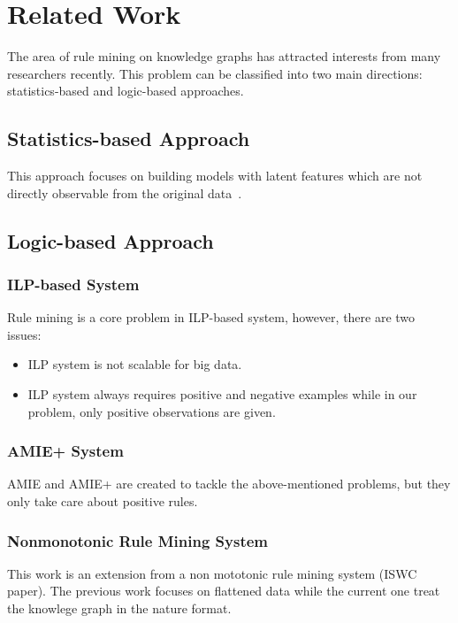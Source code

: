 \chapter{Related Work}

The area of rule mining on knowledge graphs has attracted interests from many researchers recently. This problem can be classified into two main directions: statistics-based and logic-based approaches.

\section{Statistics-based Approach}

This approach focuses on building models with latent features which are not directly observable from the original data~\cite{ref1}.

\section{Logic-based Approach}

\subsection{ILP-based System}

Rule mining is a core problem in ILP-based system, however, there are two issues:

\begin{itemize}
	\item ILP system is not scalable for big data.
	\item ILP system always requires positive and negative examples while in our problem, only positive observations are given.
\end{itemize}

\subsection{AMIE+ System}

AMIE and AMIE+ are created to tackle the above-mentioned problems, but they only take care about positive rules.

\subsection{Nonmonotonic Rule Mining System}

This work is an extension from a non mototonic rule mining system (ISWC paper). The previous work focuses on flattened data while the current one treat the knowlege graph in the nature format.
